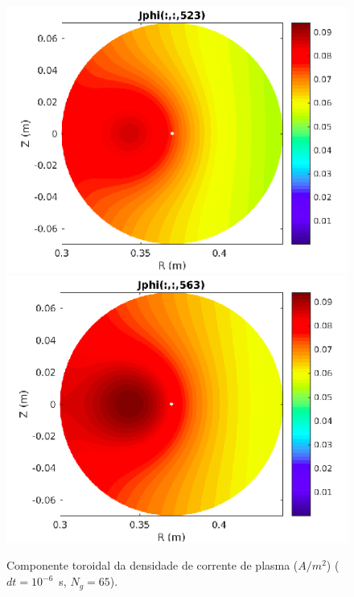 \documentclass[12pt,oneside,a4paper]{abntex2}
\begin{document}
\begin{figure}[H]
\includegraphics[scale=0.4]{../SImulacao_breakdown/Adaptacao_nova/explicito/j523.png} 
\includegraphics[scale=0.4]{../SImulacao_breakdown/Adaptacao_nova/explicito/j563.png}  
\caption{Componente toroidal da densidade de corrente de plasma ($A/m^2$) ($dt=10^{-6}$\ s, $N_g = 65$).}
\label{j3}
\end{figure}
\end{document}
